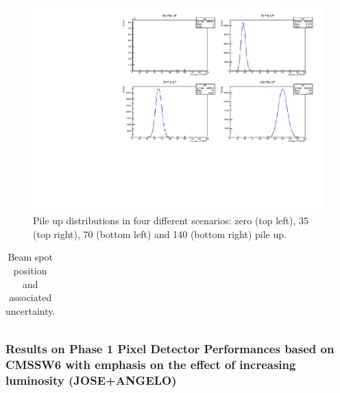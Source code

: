 \begin{figure}[!htb]
  \centering
  \includegraphics[scale=0.8]{../SimulationTools/PileUP_4scenarios.pdf}
  \caption{Pile up distributions in four different scenarios: zero (top left), 35 (top right), 70 (bottom
    left) and 140 (bottom right) pile up.}
  \label{}
\end{figure}

\begin{table}[!htb]
  \centering
  \caption{Beam spot position and associated uncertainty.}
  \label{}
  \begin{tabular}{ccc}
  \end{tabular}
\end{table}


\subsubsection{Results on Phase 1 Pixel Detector Performances based on CMSSW6 with emphasis on the effect of increasing luminosity
(JOSE+ANGELO)}


